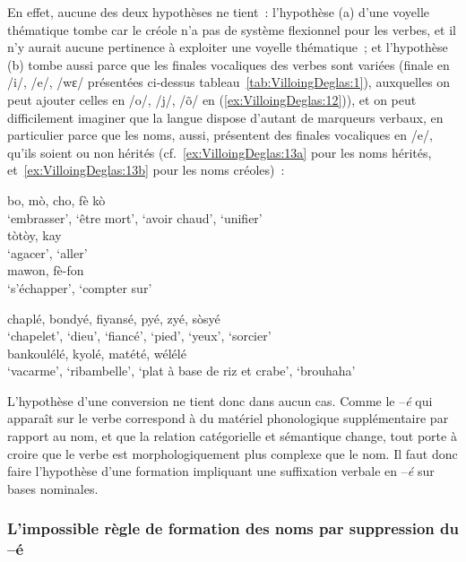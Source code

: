 \documentclass[output=paper]{langsci/langscibook}
\begin{document}
En effet, aucune des deux hypothèses ne tient~: l'hypothèse (a) d'une
voyelle thématique tombe car le créole n'a pas de système flexionnel
pour les verbes, et il n'y aurait aucune pertinence à exploiter une
voyelle thématique~; et l'hypothèse (b) tombe aussi parce que les
finales vocaliques des verbes sont variées (finale en /i/, /e/, /wɛ/
présentées ci-dessus tableau~\ref{tab:VilloingDeglas:1}), auxquelles on peut ajouter celles en
/o/, /j/, /õ/ en (\ref{ex:VilloingDeglas:12})), et on peut difficilement imaginer que la langue
dispose d'autant de marqueurs verbaux, en particulier parce que les
noms, aussi, présentent des finales vocaliques en /e/, qu'ils soient ou
non hérités (cf.~\ref{ex:VilloingDeglas:13a} pour les noms hérités, et~\ref{ex:VilloingDeglas:13b} pour les noms
créoles)~:

\ea\label{ex:VilloingDeglas:12}
  \ea\label{ex:VilloingDeglas:12a} \gll bo, mò, cho, {fè kò}\\
  `embrasser', {`être mort'}, {`avoir chaud'}, {`unifier'}\\

  \ex\label{ex:VilloingDeglas:12b} \gll tòtòy, kay\\
  `agacer', `aller'\\
  \ex\label{ex:VilloingDeglas:12c} \gll mawon, fè-fon\\
  `s'échapper', {`compter sur'}\\
  \z

\ex\label{ex:VilloingDeglas:13}
  \ea\label{ex:VilloingDeglas:13a} \gll chaplé, bondyé, fiyansé, pyé, zyé, sòsyé\\
  `chapelet', `dieu', `fiancé', `pied', `yeux', `sorcier'\\

 \ex\label{ex:VilloingDeglas:13b} \gll bankoulélé, kyolé, matété, wélélé\\
  `vacarme', `ribambelle', {`plat à base de riz et crabe'}, `brouhaha'\\
 \z
\z

L'hypothèse d'une conversion ne tient donc dans aucun cas. Comme le
--\emph{é} qui apparaît sur le verbe correspond à du matériel
phonologique supplémentaire par rapport au nom, et que la relation
catégorielle et sémantique change, tout porte à croire que le verbe est
morphologiquement plus complexe que le nom. Il faut donc faire
l'hypothèse d'une formation impliquant une suffixation verbale en
--\emph{é} sur bases nominales.

\subsubsection{L'impossible règle de formation des noms par suppression
du
--é}\label{subsubsection:VilloingDeglas:limpossible-ruxe8gle-de-formation-des-noms-par-suppression-du-é}
\end{document}
